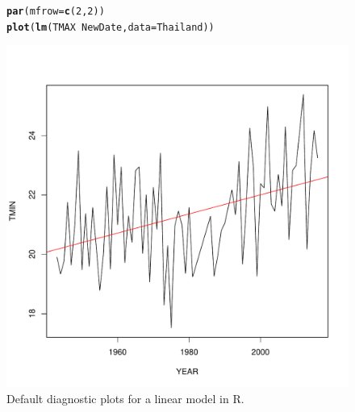\documentclass{article}\usepackage[]{graphicx}\usepackage[]{color}
\makeatletter
\def\maxwidth{ %
  \ifdim\Gin@nat@width>\linewidth
    \linewidth
  \else
    \Gin@nat@width
  \fi
}
\newcommand{\hlnum}[1]{\textcolor[rgb]{0.686,0.059,0.569}{#1}}%
\newcommand{\hlopt}[1]{\textcolor[rgb]{0,0,0}{#1}}%
\newcommand{\hlstd}[1]{\textcolor[rgb]{0.345,0.345,0.345}{#1}}%
\newcommand{\hlkwc}[1]{\textcolor[rgb]{0.333,0.667,0.333}{#1}}%
\newcommand{\hlkwd}[1]{\textcolor[rgb]{0.737,0.353,0.396}{\textbf{#1}}}%
\newenvironment{kframe}{%
 \def\at@end@of@kframe{}%
 \ifinner\ifhmode%
  \def\at@end@of@kframe{\end{minipage}}%
  \begin{minipage}{\columnwidth}%
 \fi\fi%
 \def\FrameCommand##1{\hskip\@totalleftmargin \hskip-\fboxsep
 \colorbox{shadecolor}{##1}\hskip-\fboxsep
     \hskip-\linewidth \hskip-\@totalleftmargin \hskip\columnwidth}%
 \MakeFramed {\advance\hsize-\width
   \@totalleftmargin\z@ \linewidth\hsize
   \@setminipage}}%
 {\par\unskip\endMakeFramed%
 \at@end@of@kframe}
\newenvironment{knitrout}{}{} %
\makeatother
\begin{document}
\begin{figure}
\label{fig:diagnostics}
\caption{Default diagnostic plots for a linear model in R.}
\begin{knitrout}
\color{fgcolor}\begin{kframe}
\begin{alltt}
\hlkwd{par}\hlstd{(}\hlkwc{mfrow}\hlstd{=}\hlkwd{c}\hlstd{(}\hlnum{2}\hlstd{,}\hlnum{2}\hlstd{))}
\hlkwd{plot}\hlstd{(}\hlkwd{lm}\hlstd{(TMAX} \hlopt{~} \hlstd{NewDate,} \hlkwc{data}\hlstd{=Thailand))}
\end{alltt}
\end{kframe}
\includegraphics[width=\maxwidth]{figure/unnamed-chunk-28-1} 

\end{knitrout}
\end{figure}
\end{document}
